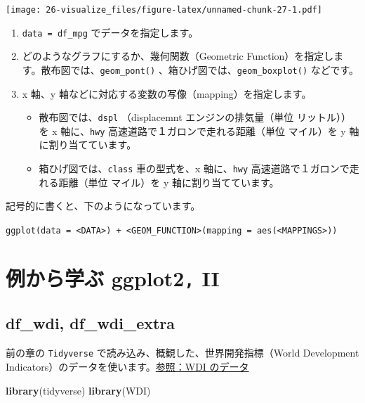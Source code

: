 \documentclass[
  xelatex, ja=standard]{bxjsbook}
\newenvironment{Shaded}{\begin{snugshade}}{\end{snugshade}}
\newcommand{\FunctionTok}[1]{\textcolor[rgb]{0.13,0.29,0.53}{\textbf{#1}}}
\newcommand{\NormalTok}[1]{#1}
\theoremstyle{definition}
\theoremstyle{definition}
\theoremstyle{definition}
\theoremstyle{definition}
\theoremstyle{remark}
\begin{document}
\texttt{[image: 26-visualize\_files/figure-latex/unnamed-chunk-27-1.pdf]}

\begin{enumerate}
\def\labelenumi{\arabic{enumi}.}
\item
  \texttt{data\ =\ df\_mpg} でデータを指定します。
\item
  どのようなグラフにするか、幾何関数（Geometric Function）を指定します。散布図では、\texttt{geom\_pont()} 、箱ひげ図では、\texttt{geom\_boxplot()} などです。
\item
  x 軸、y 軸などに対応する変数の写像（mapping）を指定します。

  \begin{itemize}
  \item
    散布図では、\texttt{dspl} （displacemnt エンジンの排気量（単位 リットル））を x 軸に、\texttt{hwy} 高速道路で１ガロンで走れる距離（単位 マイル）を y 軸に割り当てています。
  \item
    箱ひげ図では、\texttt{class} 車の型式を、x 軸に、\texttt{hwy} 高速道路で１ガロンで走れる距離（単位 マイル）を y 軸に割り当てています。
  \end{itemize}
\end{enumerate}

記号的に書くと、下のようになっています。

\texttt{ggplot(data\ =\ \textless{}DATA\textgreater{})\ +\ \textless{}GEOM\_FUNCTION\textgreater{}(mapping\ =\ aes(\textless{}MAPPINGS\textgreater{}))}

\hypertarget{ux4f8bux304bux3089ux5b66ux3076-ggplot2-ii}{%
\section{\texorpdfstring{例から学ぶ ggplot2\texttt{,} II}{例から学ぶ ggplot2, II}}\label{ux4f8bux304bux3089ux5b66ux3076-ggplot2-ii}}

\hypertarget{df_wdi-df_wdi_extra-1}{%
\subsection{df\_wdi, df\_wdi\_extra}\label{df_wdi-df_wdi_extra-1}}

前の章の \texttt{Tidyverse} で読み込み、概観した、世界開発指標（World Development Indicators）のデータを使います。\href{https://icu-hsuzuki.github.io/ds4aj/tidyverse.html\#wdi-のデータ}{参照：WDI のデータ}

\begin{Shaded}
\begin{Highlighting}[]
\FunctionTok{library}\NormalTok{(tidyverse)}
\FunctionTok{library}\NormalTok{(WDI)}
\end{Highlighting}
\end{Shaded}
\end{document}
